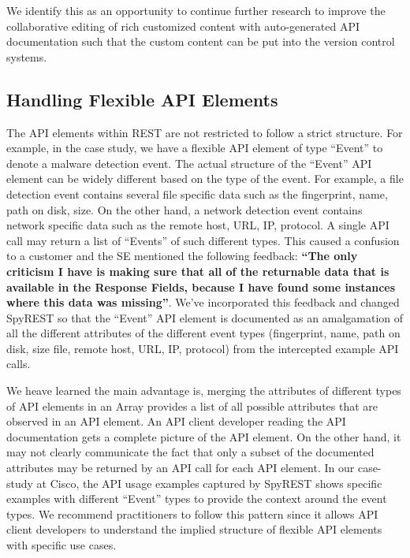 \documentclass[10pt, conference]{IEEEtran}
\begin{document}
We identify this as an opportunity to continue further research to improve the collaborative editing of rich customized content with auto-generated API documentation such that the custom content can be put into the version control systems.

\subsection{Handling Flexible API Elements}
The API elements within REST are not restricted to follow a strict structure. For example, in the case study, we have a flexible API element of type ``Event'' to denote a malware detection event. The actual structure of the ``Event'' API element can be widely different based on the type of the event. For example, a file detection event contains several file specific data such as the fingerprint, name, path on disk, size. On the other hand, a network detection event contains network specific data such as the remote host, URL, IP, protocol. A single API call may return a list of ``Events'' of such different types. This caused a confusion to a customer and the SE mentioned the following feedback: \textbf{``The only criticism I have is making sure that all of the returnable data that is available in the Response Fields, because I have found some instances where this data was missing''}. We've incorporated this feedback and changed SpyREST so that the ``Event'' API element is documented as an amalgamation of all the different attributes of the different event types (fingerprint, name, path on disk, size file, remote host, URL, IP, protocol) from the intercepted example API calls.

We heave learned the main advantage is, merging the attributes of different types of API elements in an Array provides a list of all possible attributes that are observed in an API element. An API client developer reading the API documentation gets a complete picture of the API element. On the other hand, it may not clearly communicate the fact that only a subset of the documented attributes may be returned by an API call for each API element. In our case-study at Cisco, the API usage examples captured by SpyREST shows specific examples with different ``Event'' types to provide the context around the event types. We recommend practitioners to follow this pattern since it allows API client developers to understand the implied structure of flexible API elements with specific use cases.
\end{document}
